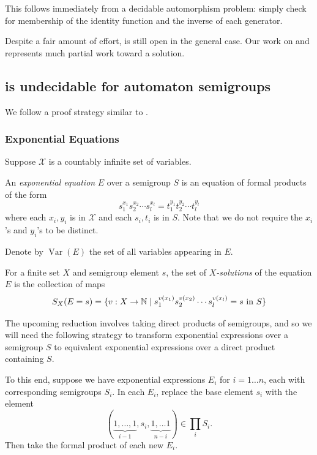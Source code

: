 \documentclass[11pt, titlepage]{article}
\begin{document}
This follows immediately from a decidable automorphism
 problem: simply check for membership of the
identity function and the inverse of each generator.

Despite a fair amount of effort,  is still open in
the general case. Our work on  and
 represents much partial work toward a solution.

\subsection{ is undecidable for automaton semigroups}
We follow a proof strategy similar to \cite{Konig15:knapsack}.


\subsubsection{Exponential Equations}

Suppose $\mathcal{X}$ is a countably infinite set of variables.
\begin{definition}
  An \emph{exponential equation} $E$ over a semigroup $S$ is an equation of 
  formal products of the form
  \[
    s_1^{x_1} s_2^{x_2}\cdots s_l^{x_l}
    = t_1^{y_1} t_2^{y_2}\cdots t_l^{y_l}
  \]
  where each $x_i, y_i$ is in $\mathcal{X}$ and each $s_i, t_i$ is in $S$. Note
  that we do not require the $x_i$'s and $y_i$'s to be distinct.
\end{definition}

Denote by $\operatorname{Var}(E)$ the set of all variables appearing
in $E$.
\begin{definition}
  For a finite set $X$ and semigroup element $s$, the set of
  \emph{$X$-solutions} of the equation $E$ is the collection of maps
  \[
    S_X(E = s) = \{ v : X \rightarrow \mathbb{N} \mid
    s_1^{v(x_1)} s_2^{v(x_2)}\cdots s_l^{v(x_l)} = s
    \text{ \normalfont in } S
    \}
  \]
\end{definition}

The upcoming reduction involves taking direct products of semigroups,
and so we will need the following strategy to transform exponential
expressions over a semigroup $S$ to equivalent exponential expressions
over a direct product containing $S$.

To this end, suppose we have exponential expressions $E_i$ for
$i = 1\ldots n$, each with corresponding semigroups $S_i$. In each
$E_i$, replace the base element $s_i$ with the element
\[
  (\underbrace{1, \ldots, 1}_\text{$i-1$}, s_i,
   \underbrace{1, \ldots 1}_\text{$n-i$}) \in \prod_i S_i.
\]
Then take the formal product of each new $E_i$.
\end{document}
